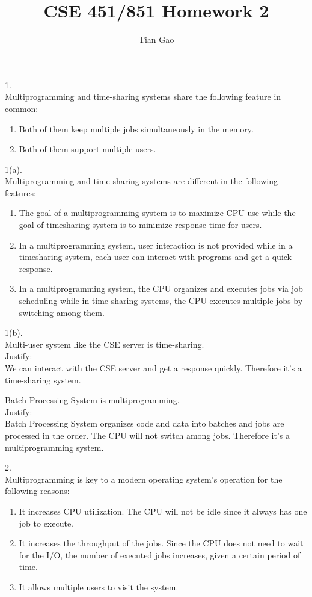 \documentclass[a4paper]{article}
\title{CSE 451/851 Homework 2}
\author{Tian Gao}
\begin{document}
\maketitle

1.\\
Multiprogramming and time-sharing systems share the following feature in common:
\begin{enumerate}
    \item Both of them keep multiple jobs simultaneously in the memory.
    \item Both of them support multiple users.
\end{enumerate}

1(a).\\
Multiprogramming and time-sharing systems are different in the following features:
\begin{enumerate}
    \item The goal of a multiprogramming system is to maximize CPU use while the goal of timesharing system is to minimize response time for users.
    \item In a multiprogramming system, user interaction is not provided while in a timesharing system, each user can interact with programs and get a quick response.
    \item In a multiprogramming system, the CPU organizes and executes jobs via job scheduling while in time-sharing systems, the CPU executes multiple jobs by switching among them.
\end{enumerate}

1(b).\\
Multi-user system like the CSE server is time-sharing.\\
Justify:\\
We can interact with the CSE server and get a response quickly.
Therefore it's a time-sharing system.

Batch Processing System is multiprogramming.\\
Justify:\\
Batch Processing System organizes code and data into batches and jobs are processed in the order.
The CPU will not switch among jobs.
Therefore it's a multiprogramming system.

2.\\
Multiprogramming is key to a modern operating system’s operation for the following reasons:
\begin{enumerate}
    \item It increases CPU utilization. The CPU will not be idle since it always has one job to execute.
    \item It increases the throughput of the jobs. Since the CPU does not need to wait for the I/O, the number of executed jobs increases, given a certain period of time.
    \item It allows multiple users to visit the system.
\end{enumerate}
\end{document}
